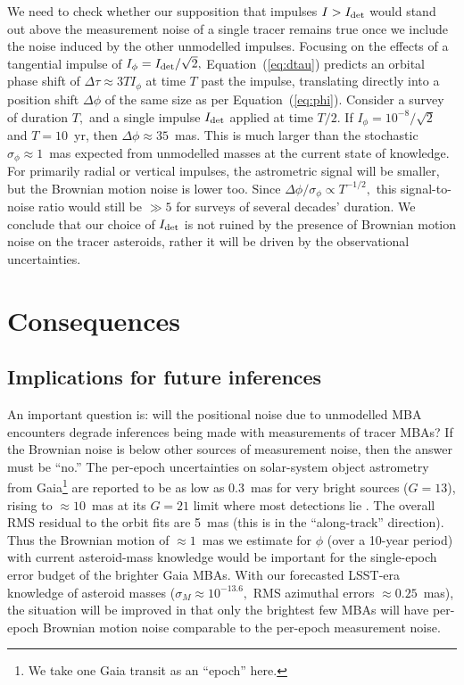 \documentclass[linenumbers, onecolumn]{aastex631}
\newcommand{\eqq}[1]{Equation~(\ref{#1})}
\begin{document}
We need to check whether our supposition that impulses $I>I_{\rm det}$
would stand out above the measurement noise of a single tracer remains
true once we include the noise induced by the other unmodelled
impulses.  Focusing on the effects of a tangential impulse of
$I_\phi=I_{\rm det}/\sqrt{2},$ \eqq{eq:dtau} predicts an orbital phase
shift of $\Delta\tau \approx 3TI_\phi$ at time $T$ past the impulse,
translating directly into a position shift $\Delta\phi$ of the same
size as per \eqq{eq:phi}.  Consider a survey of duration $T,$ and a
single impulse $I_{\rm det}$ applied at time $T/2.$ If
$I_\phi=10^{-8}/\sqrt{2}$ and $T=10$~yr, then
$\Delta\phi\approx35$~mas.  This is much larger than the
stochastic $\sigma_\phi\approx1$~mas expected from unmodelled masses at the
current state of knowledge.  For primarily radial or vertical
impulses, the astrometric signal will be smaller, but the Brownian
motion noise is lower too.  Since $\Delta\phi/\sigma_\phi \propto
T^{-1/2},$ this signal-to-noise ratio would still be $\gg 5$ for
surveys of several decades' duration.  We conclude that our choice of $I_{\rm
det}$ is not ruined by the presence of Brownian motion noise on the
tracer asteroids, rather it will be driven by the observational
uncertainties.

\section{Consequences}
\subsection{Implications for future inferences}
  
An important question is: will the positional noise due to unmodelled MBA encounters degrade inferences being made with measurements of tracer MBAs?  If the Brownian noise is below other sources of measurement noise, then the answer must be ``no.''
The per-epoch uncertainties on solar-system object astrometry from Gaia\footnote{We take one Gaia transit as an ``epoch'' here.} are reported to be as low as 0.3~mas for very bright sources ($G=13$), rising to $\approx10$~mas at its $G=21$ limit where most detections lie \citep[][Figure 6]{gaiass3}.  The overall RMS residual to the orbit fits are 5~mas (this is in the ``along-track'' direction).  Thus the Brownian motion of $\approx1$~mas we estimate for $\phi$ (over a 10-year period) with current asteroid-mass knowledge would be important for the single-epoch error budget of the brighter Gaia MBAs.  With our forecasted LSST-era knowledge of asteroid masses ($\sigma_M\approx10^{-13.6},$ RMS azimuthal errors $\approx0.25$~mas), the situation will be improved in that only the brightest few MBAs will have per-epoch Brownian motion noise comparable to the per-epoch measurement noise.
\end{document}
